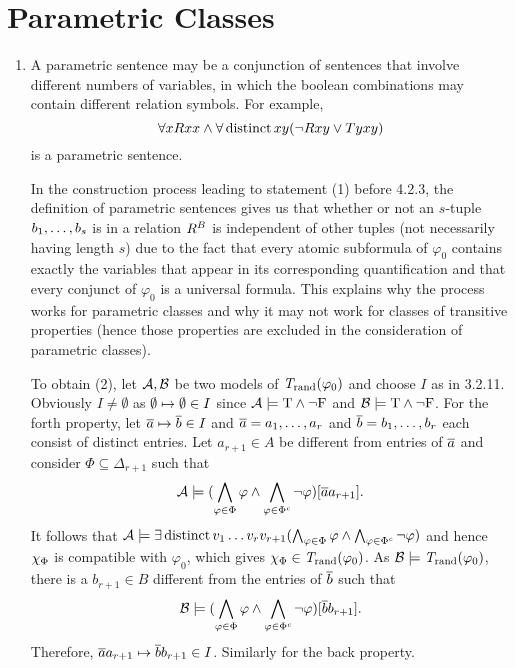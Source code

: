 \section{Parametric Classes}
\begin{enumerate}[1.]
%
\item {} A parametric sentence may be a conjunction of sentences that involve different numbers of variables, in which the boolean combinations may contain different relation symbols. For example,
\[
\forall x Rxx \land \forall \mathop{\mathrm{distinct}} x y (\neg Rxy \lor Tyxy)
\]
is a parametric sentence.

In the construction process leading to statement (1) before 4.2.3, the definition of parametric sentences gives us that whether or not an $s$-tuple $b_1, \ldots, b_s$ is in a relation $R^{B}$ is independent of other tuples (not necessarily having length $s$) due to the fact that every atomic subformula of $\varphi_0$ contains exactly the variables that appear in its corresponding quantification and that every conjunct of $\varphi_0$ is a universal formula. This explains why the process works for parametric classes and why it may not work for classes of transitive properties (hence those properties are excluded in the consideration of parametric classes).

To obtain (2), let $\mathcal{A}, \mathcal{B}$ be two models of $\mathit{T}_{\mathrm{rand}}(\varphi_0)$ and choose $I$ as in 3.2.11. Obviously $I \neq \emptyset$ as $\emptyset \mapsto \emptyset \in I$ since $\mathcal{A} \models \mathrm{T} \land \neg\mathrm{F}$ and $\mathcal{B} \models \mathrm{T} \land \neg\mathrm{F}$. For the forth property, let $\overline{a} \mapsto \overline{b} \in I$ and $\overline{a} = a_1, \ldots, a_r$ and $\overline{b} = b_1, \ldots, b_r$ each consist of distinct entries. Let $a_{r + 1} \in A$ be different from entries of $\overline{a}$ and consider $\Phi \subseteq \Delta_{r + 1}$ such that
\[
\mathcal{A} \models (\bigwedge_{\varphi \in \Phi} \varphi \land \bigwedge_{\varphi \in \Phi^\mathit{c}} \neg\varphi)[\overline{a}a_{r + 1}].
\]
It follows that $\mathcal{A} \models \exists \mathop{\mathrm{distinct}} v_1 \ldots v_rv_{r + 1} (\bigwedge_{\varphi \in \Phi} \varphi \land \bigwedge_{\varphi \in \Phi^\mathit{c}} \neg\varphi)$ and hence $\extaxm[\Phi]$ is compatible with $\varphi_0$, which gives $\extaxm[\Phi] \in \randstrtheory(\varphi_0)$. As $\mathcal{B} \models \mathit{T}_{\mathrm{rand}}(\varphi_0)$, there is a $b_{r + 1} \in B$ different from the entries of $\overline{b}$ such that
\[
\mathcal{B} \models (\bigwedge_{\varphi \in \Phi} \varphi \land \bigwedge_{\varphi \in \Phi^\mathit{c}} \neg\varphi)[\overline{b}b_{r + 1}].
\]
Therefore, $\overline{a}a_{r + 1} \mapsto \overline{b}b_{r + 1} \in I$. Similarly for the back property.


\end{enumerate}
